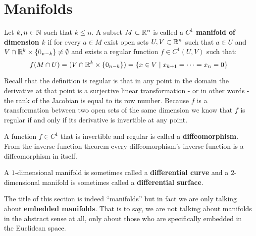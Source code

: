 \documentclass[11pt,a4paper]{article}
\begin{document}
	\section{Manifolds}
	\begin{definition}
		Let $k,n \in \mathbb{N}$ such that $k \le n$. A subset $M \subset \mathbb{R}^n$
		is called a \textbf{$C^1$ manifold of dimension \textbf{$k$}}
		if for every $a \in M$ exist open sets $U,V \subset \mathbb{R}^n$ such that
		$a \in U$ and $V \cap \mathbb{R}^k \times \{0_{n-k}\} \neq \emptyset$ and 
		exists a regular function $f \in C^1(U,V)$ such that:
		\[
			f(M \cap U) = (V \cap \mathbb{R}^k \times \{0_{n-k}\}) = 
			\{x \in V \mid x_{k+1} = \cdots = x_n = 0\}
		\]
	\end{definition}
	Recall that the definition is regular is that in any point in the domain
	the derivative at that point is a surjective linear transformation - or
	in other words - the rank of the Jacobian is equal to its row number.
	Because $f$ is a transformation between two open sets of the same
	dimension we know that $f$ is regular if and only if its derivative
	is invertible at any point.
	\begin{definition}
		A function $f \in C^1$ that is invertible and regular is called
		a \textbf{diffeomorphism}. From the inverse function theorem
		every diffeomorphism's inverse function is a diffeomorphism in itself.
	\end{definition}
	\begin{remark}
		A $1$-dimensional manifold is sometimes called a 
		\textbf{differential curve} and a $2$-dimensional manifold is 
		sometimes called a \textbf{differential surface}.
	\end{remark}
	The title of this section is indeed ``manifolds'' but in fact we
	are only talking about \textbf{embedded manifolds}. That is to say,
	we are not talking about manifolds in the abstract sense at all,
	only about those who are specifically embedded in the Euclidean space.
\end{document}
